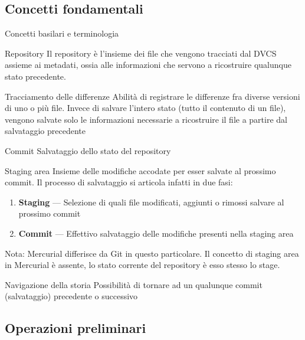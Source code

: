 \documentclass[presentation]{beamer}
\begin{document}
\subsection{Concetti fondamentali}

\begin{frame}[allowframebreaks]{Concetti basilari e terminologia}
	\begin{block}{Repository}
		Il repository è l'insieme dei file che vengono tracciati dal DVCS assieme ai metadati, ossia 
alle informazioni che servono a ricostruire qualunque stato precedente.
	\end{block}
	\begin{block}{Tracciamento delle differenze}
		Abilità di registrare le differenze fra diverse versioni di uno o più file. Invece di 
salvare l'intero stato (tutto il contenuto di un file), vengono salvate solo le informazioni 
necessarie a ricostruire il file a partire dal salvataggio precedente
	\end{block}
	\begin{block}{Commit}
		Salvataggio dello stato del repository
	\end{block}
	\begin{block}{Staging area}
		Insieme delle modifiche accodate per esser salvate al prossimo commit. Il processo di 
salvataggio si articola infatti in due fasi:
		\begin{enumerate}
			\item \textbf{Staging} --- Selezione di quali file modificati, aggiunti o rimossi 
salvare al prossimo commit
			\item \textbf{Commit} --- Effettivo salvataggio delle modifiche presenti nella staging 
area
		\end{enumerate}
		Nota: Mercurial differisce da Git in questo particolare. Il concetto di staging area in 
Mercurial è assente, lo stato corrente del repository è esso stesso lo stage.
	\end{block}
	\begin{block}{Navigazione della storia}
		Possibilità di tornare ad un qualunque commit (salvataggio) precedente o successivo
	\end{block}
\end{frame}

\subsection{Operazioni preliminari}
\end{document}
